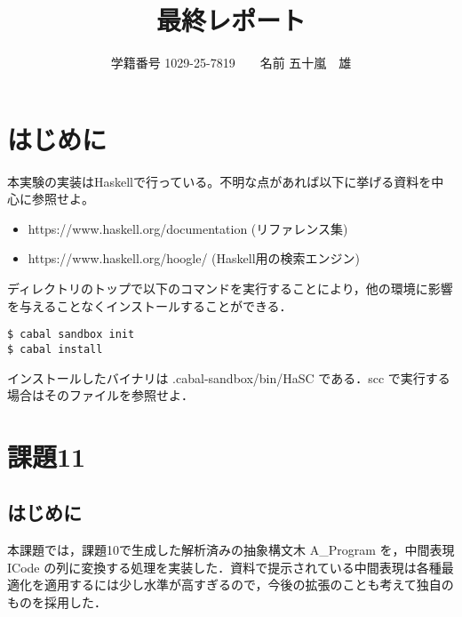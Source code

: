 \documentclass{jsarticle}
\begin{document}
\title{最終レポート}
\author{学籍番号 1029-25-7819　　名前 五十嵐　雄}
\date{}
\maketitle

\section{はじめに}
本実験の実装はHaskellで行っている。不明な点があれば以下に挙げる資料を中心に参照せよ。
\begin{itemize}
\item https://www.haskell.org/documentation (リファレンス集)
\item https://www.haskell.org/hoogle/ (Haskell用の検索エンジン)
\end{itemize}

ディレクトリのトップで以下のコマンドを実行することにより，他の環境に影響を与えることなくインストールすることができる．
\begin{verbatim}
$ cabal sandbox init
$ cabal install
\end{verbatim}

インストールしたバイナリは .cabal-sandbox/bin/HaSC である．scc で実行する場合はそのファイルを参照せよ．


\section{課題11}
\subsection{はじめに}
本課題では，課題10で生成した解析済みの抽象構文木 A\_Program を，中間表現 ICode の列に変換する処理を実装した．資料で提示されている中間表現は各種最適化を適用するには少し水準が高すぎるので，今後の拡張のことも考えて独自のものを採用した．
\end{document}
